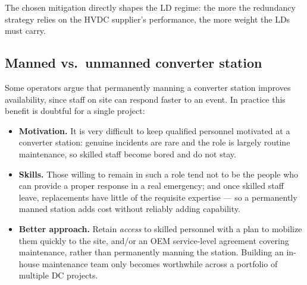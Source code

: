 The chosen mitigation directly shapes the LD regime: the more the redundancy
strategy relies on the HVDC supplier's performance, the more weight the LDs must
carry.

\subsection{Manned vs.\ unmanned converter station}
Some operators argue that permanently manning a converter station improves
availability, since staff on site can respond faster to an event. In practice
this benefit is doubtful for a single project:
\begin{itemize}\setlength{\itemsep}{0.25em}
  \item \textbf{Motivation.} It is very difficult to keep qualified personnel
        motivated at a converter station: genuine incidents are rare and the
        role is largely routine maintenance, so skilled staff become bored and
        do not stay.
  \item \textbf{Skills.} Those willing to remain in such a role tend not to be
        the people who can provide a proper response in a real emergency; and
        once skilled staff leave, replacements have little of the requisite
        expertise --- so a permanently manned station adds cost without reliably
        adding capability.
  \item \textbf{Better approach.} Retain \emph{access} to skilled personnel with
        a plan to mobilize them quickly to the site, and/or an OEM service-level
        agreement covering maintenance, rather than permanently manning the
        station. Building an in-house maintenance team only becomes worthwhile
        across a portfolio of multiple DC projects.
\end{itemize}
